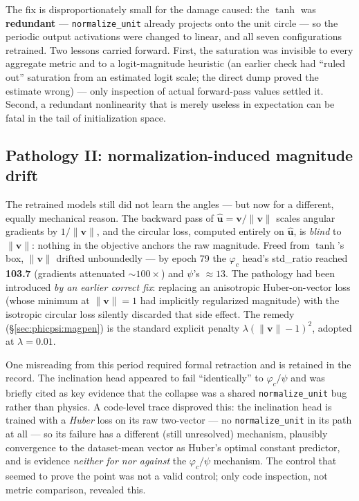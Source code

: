 The fix is disproportionately small for the damage caused: the $\tanh$ was \textbf{redundant} --- \texttt{normalize\_unit} already projects onto the unit circle --- so the periodic output activations were changed to linear, and all seven configurations retrained.
Two lessons carried forward.
First, the saturation was invisible to every aggregate metric and to a logit-magnitude heuristic (an earlier check had ``ruled out'' saturation from an estimated logit scale; the direct dump proved the estimate wrong) --- only inspection of actual forward-pass values settled it.
Second, a redundant nonlinearity that is merely useless in expectation can be fatal in the tail of initialization space.

\subsection{Pathology II: normalization-induced magnitude drift}
\label{sec:phicpsi:pathology2}

The retrained models still did not learn the angles --- but now for a different, equally mechanical reason.
The backward pass of $\hat{\mathbf{u}} = \mathbf{v}/\lVert\mathbf{v}\rVert$ scales angular gradients by $1/\lVert\mathbf{v}\rVert$, and the circular loss, computed entirely on $\hat{\mathbf{u}}$, is \emph{blind} to $\lVert\mathbf{v}\rVert$: nothing in the objective anchors the raw magnitude.
Freed from $\tanh$'s box, $\lVert\mathbf{v}\rVert$ drifted unboundedly --- by epoch 79 the $\varphi_c$ head's std\_ratio reached \textbf{103.7} (gradients attenuated ${\sim}100\times$) and $\psi$'s $\approx 13$.
The pathology had been introduced \emph{by an earlier correct fix}: replacing an anisotropic Huber-on-vector loss (whose minimum at $\lVert\mathbf{v}\rVert = 1$ had implicitly regularized magnitude) with the isotropic circular loss silently discarded that side effect.
The remedy (\S\ref{sec:phicpsi:magpen}) is the standard explicit penalty $\lambda(\lVert\mathbf{v}\rVert - 1)^2$, adopted at $\lambda = 0.01$.

One misreading from this period required formal retraction and is retained in the record.
The inclination head appeared to fail ``identically'' to $\varphi_c/\psi$ and was briefly cited as key evidence that the collapse was a shared \texttt{normalize\_unit} bug rather than physics.
A code-level trace disproved this: the inclination head is trained with a \emph{Huber} loss on its raw two-vector --- no \texttt{normalize\_unit} in its path at all --- so its failure has a different (still unresolved) mechanism, plausibly convergence to the dataset-mean vector as Huber's optimal constant predictor, and is evidence \emph{neither for nor against} the $\varphi_c/\psi$ mechanism.
The control that seemed to prove the point was not a valid control; only code inspection, not metric comparison, revealed this.

